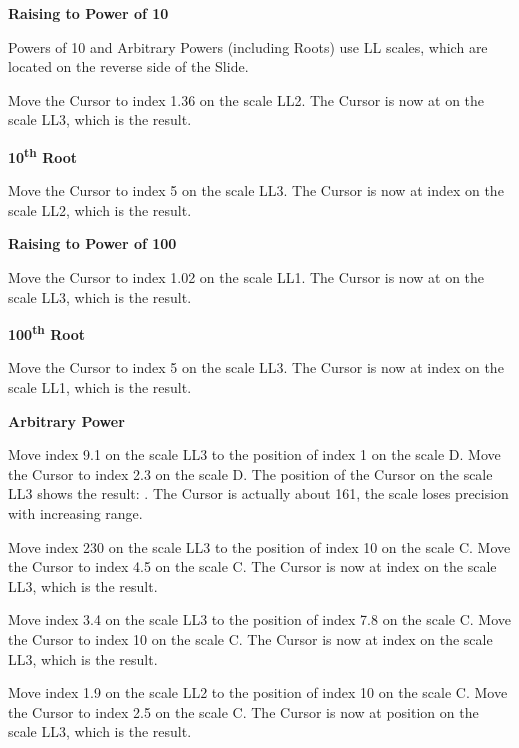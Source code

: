 \begin{multicols*}{3}
{  
  \textbf{Raising to Power of 10}

\footnotesize Powers of 10 and Arbitrary Powers (including Roots) use LL scales, which are located on the reverse side of the Slide. \normalsize

Move the Cursor to index 1.36 on the scale LL2.
The Cursor is now at  on the scale LL3, which is the result.

  \textbf{10\textsuperscript{th} Root}

Move the Cursor to index 5 on the scale LL3.
The Cursor is now at index  on the scale LL2, which is the result.

  \textbf{Raising to Power of 100}

Move the Cursor to index 1.02 on the scale LL1.
The Cursor is now at  on the scale LL3, which is the result.

  \textbf{100\textsuperscript{th} Root}

Move the Cursor to index 5 on the scale LL3.
The Cursor is now at index  on the scale LL1, which is the result.

  \textbf{Arbitrary Power}

Move index 9.1 on the scale LL3 to the position of index 1 on the scale D.
Move the Cursor to index 2.3 on the scale D.
The position of the Cursor on the scale LL3 shows the result: . The Cursor is actually about 161, the scale loses precision with increasing range. 

Move index 230 on the scale LL3 to the position of index 10 on the scale C.
Move the Cursor to index 4.5 on the scale C.
The Cursor is now at index  on the scale LL3, which is the result.

Move index 3.4 on the scale LL3 to the position of index 7.8 on the scale C.
Move the Cursor to index 10 on the scale C.
The Cursor is now at index  on the scale LL3, which is the result.

Move index 1.9 on the scale LL2 to the position of index 10 on the scale C.
Move the Cursor to index 2.5 on the scale C.
The Cursor is now at position  on the scale LL3, which is the result.

}
\end{multicols*}
